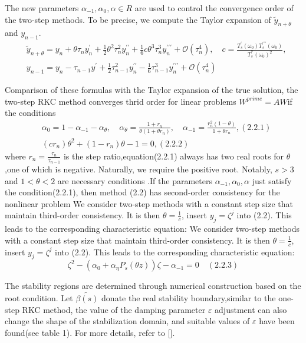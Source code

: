 \documentclass[review]{elsarticle}
\begin{document}
The new parameters $\alpha_{-1}, \alpha_{0}, \alpha \in R $ are used to control the convergence order of the two-step methods. To be precise, we compute the Taylor expansion of $\tilde{y}_{n+\theta}$ and $y_{n-1}$.
\begin{align}
    &\tilde{y}_{n+\theta}=y_n+\theta\tau_ny_n^{\prime}+\frac12\theta^2\tau_n^2y_n^{\prime\prime}+\frac16c\theta^3\tau_n^3y_n^{\prime\prime\prime}+\mathcal{O}(\tau_n^4),\quad c=\frac{T_s^{\prime}(\omega_0)T_s^{\prime\prime\prime}(\omega_0)}{T_s^{\prime\prime}(\omega_0)^2},\nonumber\\
    &{y}_{n-1}=y_n-\tau_{n-1}y^{\prime}+\frac12\tau_{n-1}^2y_n^{\prime\prime}-\frac16\tau_{n-1}^3y_n^{\prime\prime\prime}+\mathcal{O}(\tau_n^4)\nonumber
 \end{align}

Comparison of these formulas with the Taylor expansion of the true solution, the two-step RKC method converges thrid order for linear problems $W^{prime}=AW$if the conditions
\begin{align}
 &\alpha_0 = 1 - \alpha_{-1} - \alpha_{\theta}, \quad \alpha_{\theta} = \frac{1 + r_n}{\theta(1 + \theta r_n)}, \quad \alpha_{-1} = \frac{r_n^2(1 - \theta)}{1 + \theta r_n},(2.2.1)\nonumber\\
 &(cr_{n})\theta^{2}+(1-r_{n})\theta-1=0,(2.2.2)\nonumber
\end{align}
where $r_n=\frac{\tau_n}{\tau_{n-1}}$ is the step ratio,equation(2.2.1) always has two real roots for $\theta$,one of which is negative. Naturally, we require the positive root.
Notably, $s>3$ and $1<\theta<2$ are necessary conditions .If the parameters $\alpha_{-1}, \alpha_{0}, \alpha $ just satisfy the condition(2.2.1), then method (2.2) has second-order consistency for the nonlinear problem
We consider two-step methods with a constant step size that maintain third-order consistency. It is then $\theta = \frac{1}{c}$, insert $y_j=\zeta^j$ into (2.2). This leads to the corresponding characteristic equation:
We consider two-step methods with a constant step size that maintain third-order consistency. It is then $\theta = \frac{1}{c}$, insert $y_j=\zeta^j$ into (2.2). This leads to the corresponding characteristic equation:
$$
\zeta^2 - (\alpha_0 + \alpha_\eta P_s(\theta z))\zeta - \alpha_{-1} = 0 \quad (2.2.3)
$$

The stability regions are determined through numerical construction based on the root condition. Let $\tilde{\beta(s)}$ donate the real stability boundary,similar to the one-step RKC method, 
the value of the damping parameter $\varepsilon$ adjustment can also change the shape of the stabilization domain, and suitable values of $\varepsilon$ have been found(see table 1). For more details, refer to [].
\end{document}
